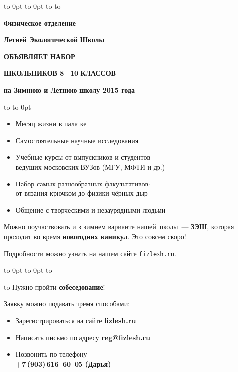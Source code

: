 \documentclass[a4paper,12pt]{article}
\begin{document}
\vbox to 0pt{%
\vbox to 0pt{\vskip9pt
\hbox to \vss}%
}%
\vskip28pt
\hbox to 
\vskip 34pt
\centerline{\Large\textbf{Физическое отделение}}
\vskip 10pt
\centerline{\Large\textbf{Летней Экологической Школы}}
\vskip15pt
\centerline{\huge\textsf{\textbf{ОБЪЯВЛЯЕТ НАБОР}}}
\vskip 15pt
\centerline{\huge\textsf{\textbf{ШКОЛЬНИКОВ 8\,--\,10 КЛАССОВ}}}
\vskip 10pt
\centerline{\Large\textbf{на
Зимнюю и Летнюю школу {\Huge 2015} года}}
\vskip24pt
\hbox to 
\vskip-24pt\hbox to 0pt{}

{\Large%
\begin{itemize}
\setlength{\itemsep}{-4pt}
\setlength{\parindent}{0pt}
\item Месяц жизни в палатке
\item Самостоятельные научные исследования
\item Учебные курсы от выпускников и студентов\\ведущих московских ВУЗов (МГУ, МФТИ и др.)
\item Набор самых разнообразных факультативов:\\от вязания крючком до физики чёрных дыр
\item Общение с творческими и незаурядными людьми
\end{itemize}

Можно поучаствовать и в зимнем варианте нашей школы~--- \textbf{ЗЭШ},
которая проходит во время \textbf{новогодних каникул}. Это совсем скоро!

\vskip 12pt

Подробности можно узнать на нашем сайте {\huge\texttt{fizlesh.ru}}.

\vbox to 0pt{%
\vbox to 0pt{%
\vskip21mm
\hbox to \vss}%
}%

\hbox to 
\vskip6pt
Нужно пройти \textbf{собеседование}!\par
Заявку можно подавать тремя способами:
\begin{itemize}
\setlength{\itemsep}{-4pt}
\item Зарегистрироваться на сайте \textbf{fizlesh.ru}
\item Написать письмо по адресу \textbf{reg@fizlesh.ru}
\item Позвонить по телефону\\
\textbf{+7\,(903)\,616--60--05 (Дарья)}
\end{itemize}
}%
\end{document}
